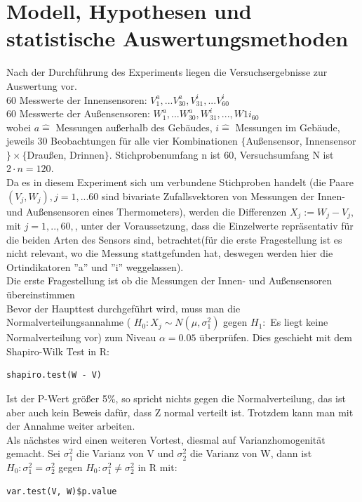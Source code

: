 \documentclass[ ngerman, fontsize= 12pt, paper=a4, headings=big, titlepage=true]{article}
\begin{document}
\section{Modell, Hypothesen und statistische Auswertungsmethoden}
Nach der Durchführung des Experiments liegen die Versuchsergebnisse zur Auswertung vor. \\
60 Messwerte der Innensensoren:  $ V^a_{1}, ...V^a_{30}, V^i_{31}, ... V^i_{60} $   \\
60 Messwerte der Außensensoren:  $ W^a_1, ...W^a_{30},W^i_{31},..., W1 i_{60} $ \\
wobei $a \hat{=}$ Messungen außerhalb des Gebäudes,   $i \hat{=} $ Messungen im Gebäude, jeweils 30 Beobachtungen für alle vier Kombinationen $\{$Außensensor, Innensensor$\} \times \{$Draußen, Drinnen$\} $. Stichprobenumfang n ist 60, Versuchsumfang N ist $2 \cdot n =120 $. \\
Da es in diesem Experiment sich um verbundene Stichproben handelt (die Paare $ ( V_j, W_j ), j = 1,...60 $ sind bivariate Zufallsvektoren von Messungen der Innen- und Außensensoren eines Thermometers), werden die Differenzen $ X_j := W_j - V_j,$ mit  $j = 1, .., 60, $, unter der Voraussetzung, dass die Einzelwerte repräsentativ für die beiden Arten des Sensors sind, betrachtet(für die erste Fragestellung ist es nicht relevant, wo die Messung stattgefunden hat, deswegen werden hier die Ortindikatoren ''a'' und ''i'' weggelassen). \\
Die erste Fragestellung ist ob die Messungen der Innen- und Außensensoren übereinstimmen \\
Bevor der Haupttest durchgeführt wird, muss man die Normalverteilungsannahme ( $ H_0: X_j  \sim N( \mu , \sigma_1^2 )$ gegen $H_1:$ Es liegt keine Normalverteilung vor) zum Niveau $ \alpha = 0.05 $  überprüfen. Dies geschieht mit dem Shapiro-Wilk Test in R:
\begin{lstlisting}
shapiro.test(W - V)
\end{lstlisting}
Ist der P-Wert größer 5\%, so spricht nichts gegen die Normalverteilung, das ist aber auch kein Beweis dafür, dass Z normal verteilt ist. Trotzdem kann man mit der Annahme weiter arbeiten. \\ 
Als nächstes wird einen weiteren Vortest, diesmal auf Varianzhomogenität gemacht. Sei $\sigma^2_1 $ die Varianz von V und $\sigma^2_2 $ die Varianz von W, dann ist  
$ H_0: \sigma^2_1 = \sigma^2_2  $ gegen $ H_0: \sigma^2_1 \neq \sigma^2_2  $ in R mit: \begin{lstlisting}
var.test(V, W)$p.value
\end{lstlisting}
\end{document}
